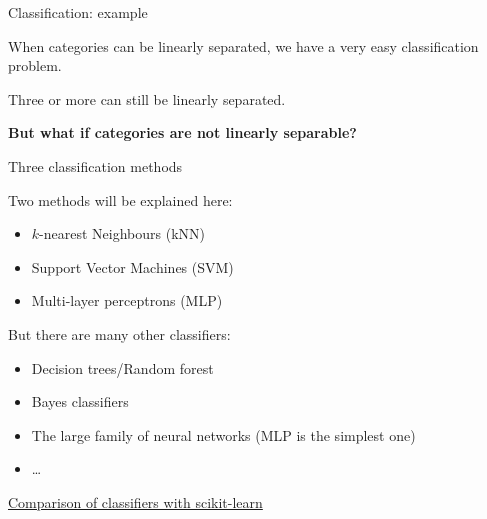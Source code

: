 \documentclass[compress,xcolor=table]{beamer}
\begin{document}
\begin{frame}{Classification: example}
\begin{center}
{\begin{tikzpicture}[>=latex,
                starmarker/.style={star, fill=hriSec2Comp,opacity=0.5,inner sep=0,minimum size=4pt}]
            \end{tikzpicture}
        }
    \end{center}


     {
        When categories can be linearly separated, we have a very easy
        classification problem.
    }

     {
        Three or more can still be linearly separated.
    }


     {
        \textbf{But what if categories are not linearly separable?}
    }

\end{frame}

\begin{frame}{Three classification methods}

Two methods will be explained here:

\begin{itemize}

\item $k$-nearest Neighbours (kNN)
\item Support Vector Machines (SVM)
\item Multi-layer perceptrons (MLP)
\end{itemize}

But there are many other classifiers:

\begin{itemize}

\item Decision trees/Random forest
\item Bayes classifiers
\item The large family of neural networks (MLP is the simplest one)
\item \ldots{}
\end{itemize}

    \href{https://scikit-learn.org/stable/auto_examples/classification/plot_classifier_comparison.html}{Comparison
    of classifiers with scikit-learn}

\end{frame}
\end{document}
